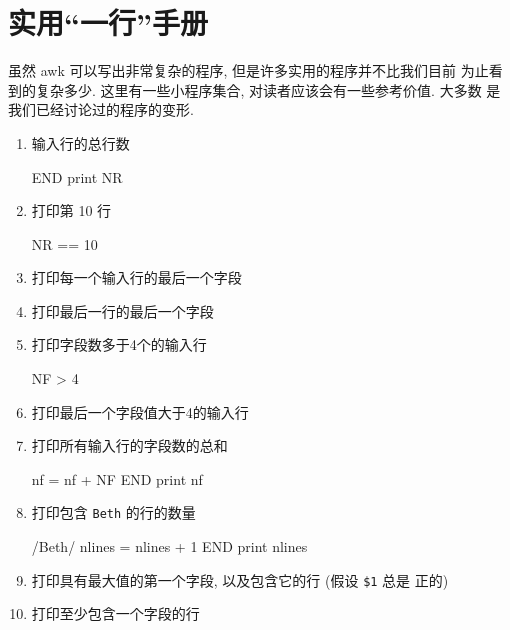 \section{实用``一行''手册}
\label{sec:a_handful_of_useful_one_liners}

虽然 awk 可以写出非常复杂的程序, 但是许多实用的程序并不比我们目前
为止看到的复杂多少. 这里有一些小程序集合, 对读者应该会有一些参考价值. 大多数
是我们已经讨论过的程序的变形.
\begin{enumerate}
\item 输入行的总行数
\begin{awkcode}
    END { print NR }
\end{awkcode}
\item 打印第 10 行
\begin{awkcode}
    NR == 10
\end{awkcode}
\item 打印每一个输入行的最后一个字段
\item 打印最后一行的最后一个字段
\item 打印字段数多于4个的输入行
\begin{awkcode}
    NF > 4
\end{awkcode}
\item 打印最后一个字段值大于4的输入行
\item 打印所有输入行的字段数的总和
\begin{awkcode}
    { nf = nf + NF }
    END { print nf }
\end{awkcode}
\item 打印包含 \texttt{Beth} 的行的数量
\begin{awkcode}
    /Beth/ { nlines = nlines + 1 }
    END { print nlines }
\end{awkcode}
\item 打印具有最大值的第一个字段, 以及包含它的行 (假设 \verb'$1' 总是
    正的)
\item 打印至少包含一个字段的行
\begin{awkcode}

\end{awkcode}
\end{enumerate}
